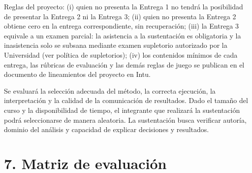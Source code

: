 \documentclass[11pt,a4paper]{article}
\begin{document}
Reglas del proyecto: (i) quien no presenta la Entrega 1 no tendrá la posibilidad de presentar la Entrega 2 ni la Entrega 3; (ii) quien no presenta la Entrega 2 obtiene cero en la entrega correspondiente, sin recuperación; (iii) la Entrega 3 equivale a un examen parcial: la asistencia a la sustentación es obligatoria y la inasistencia solo se subsana mediante examen supletorio autorizado por la Universidad (ver política de supletorios); (iv) los contenidos mínimos de cada entrega, las rúbricas de evaluación y las demás reglas de juego se publican en el documento de lineamientos del proyecto en Intu.

\vspace{0.3cm}

Se evaluará la selección adecuada del método, la correcta ejecución, la interpretación y la calidad de la comunicación de resultados. Dado el tamaño del curso y la disponibilidad de tiempo, el integrante que realizará la sustentación podrá seleccionarse de manera aleatoria. La sustentación busca verificar autoría, dominio del análisis y capacidad de explicar decisiones y resultados.

\section*{7. Matriz de evaluación}

\end{document}
